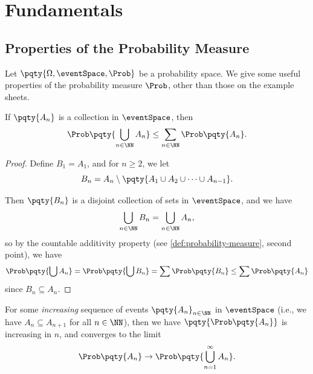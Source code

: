 \section{Fundamentals}

\subsection{Properties of the Probability Measure}

Let \(\pqty{\Omega, \eventSpace, \Prob}\) be a probability space. We give some useful properties of the probability measure \(\Prob\), other than those on the example sheets.

\begin{proposition}
    \label{prop:countable-subadditivity}%
    If \(\pqty{A_n}\) is a collection in \(\eventSpace\), then
    \[
        \Prob\pqty{\bigcup_{n \in \NN} A_n} \leq \sum_{n \in \NN} \Prob\pqty{A_n}.
    \]
\end{proposition}

\begin{proof}
    Define \(B_1 = A_1\), and for \(n \geq 2\), we let
    \[
        B_n = A_n \setminus \pqty{A_1 \cup A_2 \cup \cdots \cup A_{n - 1}}.
    \]

    Then \(\pqty{B_n}\) is a disjoint collection of sets in \(\eventSpace\), and we have
    \[
        \bigcup_{n \in \NN} B_n = \bigcup_{n \in \NN} A_n,
    \]
    so by the countable additivity property (see \autoref{def:probability-measure}, second point), we have
    \[
        \Prob\pqty{\bigcup A_n} = \Prob\pqty{\bigcup B_n} = \sum \Prob\pqty{B_n} \leq \sum \Prob\pqty{A_n}
    \]
    since \(B_n \subseteq A_n\).
\end{proof}

\begin{proposition}
    \label{prop:continuity-of-probability-measure}%
    For some \emph{increasing} sequence of events \(\pqty{A_n}_{n \in \NN}\) in \(\eventSpace\) (i.e., we have \(A_n \subseteq A_{n + 1}\) for all \(n \in \NN\)), then we have \(\pqty{\Prob\pqty{A_n}}\) is increasing in \(n\), and converges to the limit
    \[
        \Prob\pqty{A_n} \to \Prob\pqty{\bigcup_{n = 1}^{\infty} A_n}.
    \]
\end{proposition}


